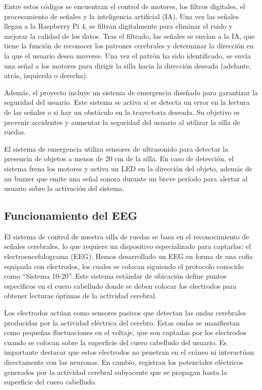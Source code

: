 \documentclass{article}
\begin{document}
Entre estos códigos se encuentran el control de motores, los filtros digitales, el procesamiento de señales y la inteligencia artificial (IA). Una vez las señales llegan a la Raspberry Pi 4, se filtran digitalmente para eliminar el ruido y mejorar la calidad de los datos. Tras el filtrado, las señales se envían a la IA, que tiene la función de reconocer los patrones cerebrales y determinar la dirección en la que el usuario desea moverse. Una vez el patrón ha sido identificado, se envía una señal a los motores para dirigir la silla hacia la dirección deseada (adelante, atrás, izquierda o derecha).

Además, el proyecto incluye un sistema de emergencia diseñado para garantizar la seguridad del usuario. Este sistema se activa si se detecta un error en la lectura de las señales o si hay un obstáculo en la trayectoria deseada. Su objetivo es prevenir accidentes y aumentar la seguridad del usuario al utilizar la silla de ruedas.

El sistema de emergencia utiliza sensores de ultrasonido para detectar la presencia de objetos a menos de 20 cm de la silla. En caso de detección, el sistema frena los motores y activa un LED en la dirección del objeto, además de un buzzer que emite una señal sonora durante un breve período para alertar al usuario sobre la activación del sistema.

\subsection{Funcionamiento del EEG}

El sistema de control de nuestra silla de ruedas se basa en el reconocimiento de señales cerebrales, lo que requiere un dispositivo especializado para captarlas: el electroencefalograma (EEG). Hemos desarrollado un EEG en forma de una cofia equipada con electrodos, los cuales se colocan siguiendo el protocolo conocido como “Sistema 10-20”. Este sistema estándar de ubicación define puntos específicos en el cuero cabelludo donde se deben colocar los electrodos para obtener lecturas óptimas de la actividad cerebral.

Los electrodos actúan como sensores pasivos que detectan las ondas cerebrales producidas por la actividad eléctrica del cerebro. Estas ondas se manifiestan como pequeñas fluctuaciones en el voltaje, que son captadas por los electrodos cuando se colocan sobre la superficie del cuero cabelludo del usuario. Es importante destacar que estos electrodos no penetran en el cráneo ni interactúan directamente con las neuronas. En cambio, registran los potenciales eléctricos generados por la actividad cerebral subyacente que se propagan hasta la superficie del cuero cabelludo.
\end{document}
